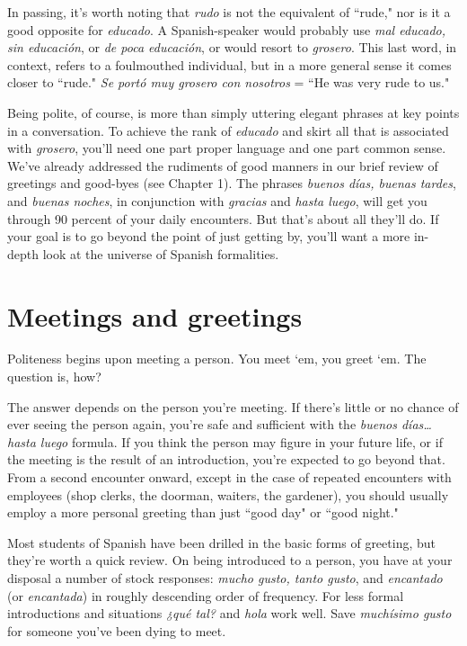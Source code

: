 In passing, it's worth noting that \emph{rudo} is not the equivalent of
``rude," nor is it a good opposite for \emph{educado}. A Spanish-speaker would
probably use \emph{mal educado, sin educación}, or \emph{de poca educación}, or
would resort to \emph{grosero}. This last word, in context, refers to a foulmouthed individual, but in a more general sense it comes closer to
``rude." \emph{Se portó muy grosero con nosotros} = ``He was very rude
to us."

Being polite, of course, is more than simply uttering elegant
phrases at key points in a conversation. To achieve the rank of \emph{educado} and skirt all that is associated with \emph{grosero}, you'll need one part
proper language and one part common sense. We've already addressed
the rudiments of good manners in our brief review of greetings and
good-byes (see Chapter 1). The phrases \emph{buenos días, buenas tardes},
and \emph{buenas noches}, in conjunction with \emph{gracias} and \emph{hasta luego},
will get you through 90 percent of your daily encounters. But that's
about all they'll do. If your goal is to go beyond the point of just getting by, you'll want a more in-depth look at the universe of Spanish
formalities.

\section{Meetings and greetings}

Politeness begins upon meeting a person. You meet `em, you
greet `em. The question is, how?

The answer depends on the person you're meeting. If there's
little or no chance of ever seeing the person again, you're safe and sufficient with the \emph{buenos días\ldots{} hasta luego} formula. If you think the
person may figure in your future life, or if the meeting is the result of
an introduction, you're expected to go beyond that. From a second encounter onward, except in the case of repeated encounters with employees (shop clerks, the doorman, waiters, the gardener), you should
usually employ a more personal greeting than just ``good day" or ``good
night."

Most students of Spanish have been drilled in the basic forms
of greeting, but they're worth a quick review. On being introduced to a
person, you have at your disposal a number of stock responses: \emph{mucho
	gusto, tanto gusto}, and \emph{encantado} (or \emph{encantada}) in roughly descending order of frequency. For less formal introductions and situations
\emph{¿qué tal?} and \emph{hola} work well. Save \emph{muchísimo gusto} for someone
you've been dying to meet.

